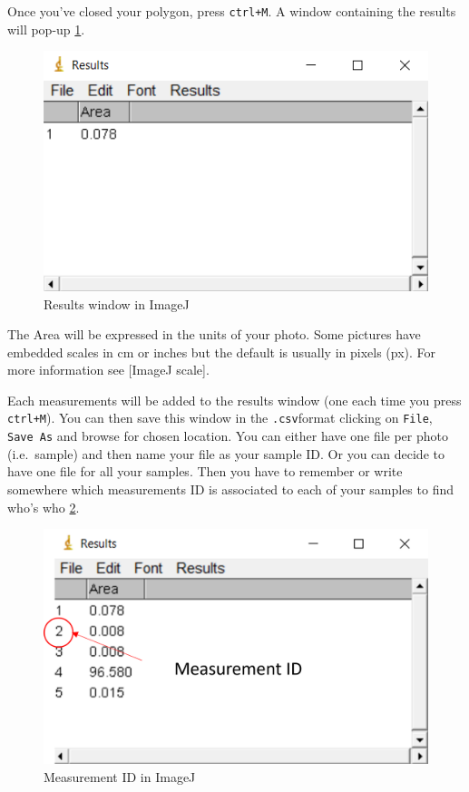 \documentclass[
  12pt,
  american,
  a4paper,
  extrafontsizes,onecolumn,openright
  ]{memoir}
\begin{document}
\normalsize

Once you've closed your polygon, press \texttt{ctrl+M}.
A window containing the results will pop-up \ref{fig:ctrlmpopup}.

\scriptsize

\begin{figure}

{\centering \includegraphics[width=0.5\linewidth]{document/trait/shootmorpho/ctrlMpopup} 

}

\caption{Results window in ImageJ}\label{fig:ctrlmpopup}
\end{figure}

\normalsize

The Area will be expressed in the units of your photo.
Some pictures have embedded scales in cm or inches but the default is usually in pixels (px).
For more information see {[}ImageJ scale{]}.

Each measurements will be added to the results window (one each time you press \texttt{ctrl+M}).
You can then save this window in the \texttt{.csv}format clicking on \texttt{File}, \texttt{Save\ As} and browse for chosen location.
You can either have one file per photo (i.e.~sample) and then name your file as your sample ID.
Or you can decide to have one file for all your samples.
Then you have to remember or write somewhere which measurements ID is associated to each of your samples to find who's who \ref{fig:measid}.

\scriptsize

\begin{figure}

{\centering \includegraphics[width=0.5\linewidth]{document/trait/shootmorpho/measurementID} 

}

\caption{Measurement ID in ImageJ}\label{fig:measid}
\end{figure}
\end{document}
